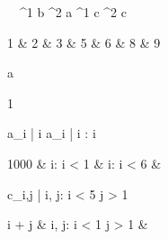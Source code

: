 \begin{eqcode}{\mu}{\ }{\ }{^1}
  b ^2 \lend
  a \in {}^1 \lend
  c \in {}^2 \lend
  c \gets \begin{tmatrix}
    1 & 2 & 3  & 5 & 6  & 8 & 9 \lend
  \end{tmatrix} \lend
  a \gets 
  \begin{tmatrix}
    1   \lend
  \end{tmatrix} \lend
  a_i | \forall i  \lend
a_i | i : i  \gets
  \begin{cases}
    1000 & i: i < 1  & i: i < 6  & \otherwise \lend
  \end{cases}\lend
  c_{i,j} | i, j: i < 5 \cap j > 1 \gets 
  \begin{cases}
    i + j & i, j: i < 1 \cap j > 1  & \otherwise \lend
  \end{cases} \lend
   \lend
\end{eqcode}
